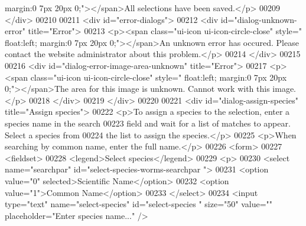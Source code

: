 \begin{DoxyCode}
{       margin:0 7px 20px 0;"}></span>All selections have been saved.</p>
00209         </div>
00210 
00211         <div \textcolor{keywordtype}{id}=\textcolor{stringliteral}{"error-dialogs"}>
00212             <div \textcolor{keywordtype}{id}=\textcolor{stringliteral}{"dialog-unknown-error"} title=\textcolor{stringliteral}{"Error"}>
00213                 <p><span \textcolor{keyword}{class}=\textcolor{stringliteral}{"ui-icon ui-icon-circle-close"} style=\textcolor{stringliteral}{"
      float:left; margin:0 7px 20px 0;"}></span>An unknown error has occured. Please contact the 
      website administrator about \textcolor{keyword}{this} problem.</p>
00214             </div>
00215 
00216             <div \textcolor{keywordtype}{id}=\textcolor{stringliteral}{"dialog-error-image-area-unknown"} title=\textcolor{stringliteral}{"Error"}>
00217                 <p><span \textcolor{keyword}{class}=\textcolor{stringliteral}{"ui-icon ui-icon-circle-close"} style=\textcolor{stringliteral}{"
      float:left; margin:0 7px 20px 0;"}></span>The area \textcolor{keywordflow}{for} \textcolor{keyword}{this} image is unknown. Cannot work 
      with \textcolor{keyword}{this} image.</p>
00218             </div>
00219         </div>
00220 
00221         <div \textcolor{keywordtype}{id}=\textcolor{stringliteral}{"dialog-assign-species"} title=\textcolor{stringliteral}{"Assign species"}>
00222             <p>To assign a species to the selection, enter a species name in 
      the search
00223             field and wait \textcolor{keywordflow}{for} a list of matches to appear. Select a species 
      from
00224             the list to assign the species.</p>
00225             <p>When searching by common name, enter the full name.</p>
00226             <form>
00227             <fieldset>
00228                 <legend>Select species</legend>
00229                 <p>
00230                     <select name=\textcolor{stringliteral}{"searchpar"} \textcolor{keywordtype}{id}=\textcolor{stringliteral}{"select-species-worms-searchpar
      "}>
00231                         <option value=\textcolor{stringliteral}{"0"} selected>Scientific Name</option>
00232                         <option value=\textcolor{stringliteral}{"1"}>Common Name</option>
00233                     </select>
00234                     <input type=\textcolor{stringliteral}{"text"} name=\textcolor{stringliteral}{"select-species"} \textcolor{keywordtype}{id}=\textcolor{stringliteral}{"select-species
      "} size=\textcolor{stringliteral}{"50"} value=\textcolor{stringliteral}{""} placeholder=\textcolor{stringliteral}{"Enter species name..."} />

\end{DoxyCode}
